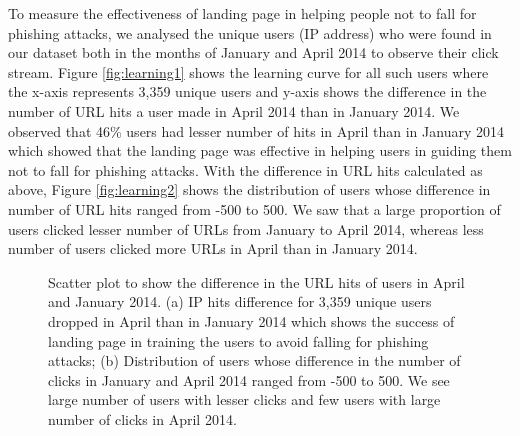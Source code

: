 \documentclass[conference]{IEEEtran}
\begin{document}
To measure the effectiveness of landing page in helping people not to fall for phishing attacks, we analysed the unique users (IP address) who were found in our dataset both in the months of January and April 2014 to observe their click stream. Figure \ref{fig:learning1} shows the learning curve for all such users where the x-axis represents 3,359 unique users and y-axis shows the difference in the number of URL hits a user made in April 2014 than in January 2014. We observed that 46\% users had lesser number of hits in April than in January 2014 which showed that the landing page was effective in helping users in guiding them not to fall for phishing attacks. With the difference in URL hits calculated as above, Figure \ref{fig:learning2} shows the distribution of users whose difference in number of URL hits ranged from -500 to 500. We saw that a large proportion of users clicked lesser number of URLs from January to April 2014, whereas less number of users clicked more URLs in April than in January 2014.

\begin{figure*}[t]
\centering
{}
\hfil\hfil
{}
\caption{Scatter plot to show the difference in the URL hits of users in April and January 2014. (a) IP hits difference for 3,359 unique users dropped in April than in January 2014 which shows the success of landing page in training the users to avoid falling for phishing attacks; (b) Distribution of users whose difference in the number of clicks in January and April 2014 ranged from -500 to 500. We see large number of users with lesser clicks and few users with large number of clicks in April 2014.}
\label{fig:learning}
\end{figure*}
\end{document}
